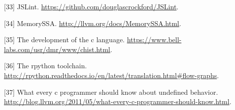 \documentclass[]{article}
\begin{document}
\hypertarget{ref-jslint}{}
{[}33{]} JSLint. \url{https://github.com/douglascrockford/JSLint}.

\hypertarget{ref-memoryssallvm}{}
{[}34{]} MemorySSA. \url{http://llvm.org/docs/MemorySSA.html}.

\hypertarget{ref-cdev}{}
{[}35{]} The development of the c language.
\url{https://www.bell-labs.com/usr/dmr/www/chist.html}.

\hypertarget{ref-pypy}{}
{[}36{]} The rpython toolchain.
\url{http://rpython.readthedocs.io/en/latest/translation.html\#flow-graphs}.

\hypertarget{ref-lattner}{}
{[}37{]} What every c programmer should know about undefined behavior.
\url{http://blog.llvm.org/2011/05/what-every-c-programmer-should-know.html}.
\end{document}
